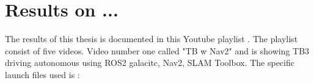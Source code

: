 \chapter{Results on ...}

The results of this thesis is documented in this Youtube playlist \cite{youtube_playlist_results}. The playlist consist of five videos. 
Video number one called "TB w Nav2" and is showing TB3 driving autonomous using ROS2 galacitc, Nav2, SLAM Toolbox. 
The specific launch files used is : 


